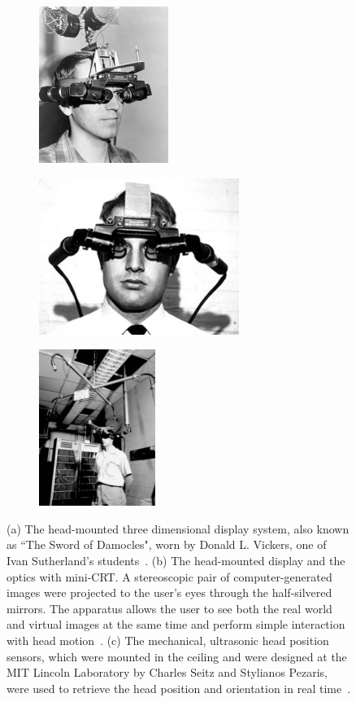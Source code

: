 \begin{figure}[t]
\centering
\begin{subfigure}[t]{1.75in}
  \centering
  \includegraphics[height=2.0in]{ch1/figures/sutherland/3.jpeg}
  \caption{}
  \label{ivansetup1}
\end{subfigure}
\begin{subfigure}[t]{2.6in}
  \centering
  \includegraphics[height=2.0in]{ch1/figures/sutherland/2.jpeg}
  \caption{}
  \label{ivansetup2}
\end{subfigure}
\begin{subfigure}[t]{1.4in}
  \centering
  \includegraphics[height=2.0in]{ch1/figures/sutherland/1.jpeg}
  \caption{}
  \label{ivansetup3}
\end{subfigure}
\caption{(a) The head-mounted three dimensional display system, also known as ``The Sword of 
Damocles", worn by Donald L. Vickers, one of Ivan Sutherland's students~\cite{sutherland1968head}. (b) The head-mounted 
display and the optics with mini-CRT. A stereoscopic pair of computer-generated images were 
projected to the user's eyes through the half-silvered mirrors. The apparatus allows the user to see 
both the real world and virtual images at the same time and perform simple interaction with head 
motion~\cite{sutherland1968head}. (c) The mechanical, ultrasonic head position sensors, which were mounted in the ceiling and 
were designed at the MIT Lincoln Laboratory by Charles Seitz and Stylianos Pezaris, were used to 
retrieve the head position and orientation in real time~\cite{sutherland1968head}.}
\label{ivanfullsetup}
\end{figure}

